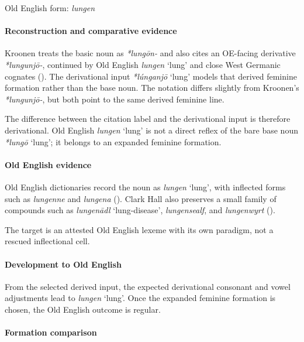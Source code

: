 \documentclass[
  british,
  a4paper,
]{article}
\providecommand{\Recon}[1]{\emph{*#1}}
\begin{document}
Old English form: \emph{lungen}

\paragraph{Reconstruction and comparative
evidence}\label{reconstruction-and-comparative-evidence-104}

Kroonen treats the basic noun as \emph{*lungōn-} and also cites an
OE-facing derivative \emph{*lungunjō-}, continued by Old English
{\emph{lungen}} `lung' and close West Germanic cognates
(). The derivational input
\Recon{lúnganjō} `lung' models that derived feminine formation rather
than the base noun. The notation differs slightly from Kroonen's
\emph{*lungunjō-}, but both point to the same derived feminine line.

The difference between the citation label and the derivational input is
therefore derivational. Old English {\emph{lungen}} `lung' is not a
direct reflex of the bare base noun \Recon{lungō} `lung'; it belongs to
an expanded feminine formation.

\paragraph{Old English evidence}\label{old-english-evidence-106}

Old English dictionaries record the noun as {\emph{lungen}} `lung', with
inflected forms such as \emph{lungenne} and \emph{lungena}
().
Clark Hall also preserves a small family of compounds such as
\emph{lungenādl} `lung-disease', \emph{lungensealf}, and
\emph{lungenwyrt} ().

The target is an attested Old English lexeme with its own paradigm, not
a rescued inflectional cell.

\paragraph{Development to Old
English}\label{development-to-old-english-104}

From the selected derived input, the expected derivational consonant and
vowel adjustments lead to {\emph{lungen}} `lung'. Once the expanded
feminine formation is chosen, the Old English outcome is regular.

\paragraph{Formation comparison}\label{formation-comparison-2}
\end{document}
